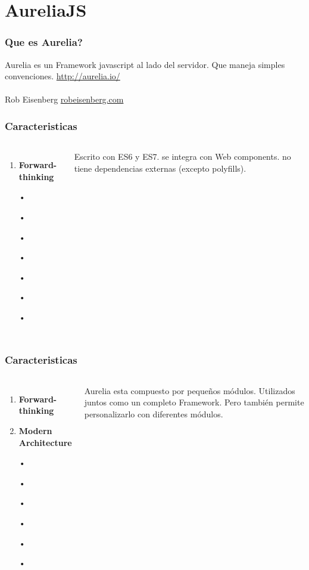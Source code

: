 \documentclass{beamer}
\begin{document}
\section{AureliaJS} %
\begin{frame}
\frametitle{Que es Aurelia?}
Aurelia es un Framework javascript al lado del servidor. Que maneja simples convenciones.
{\color{blue}\url{http://aurelia.io/}}
\\~\\
Rob Eisenberg
{\color{blue}\url{robeisenberg.com}}
\end{frame}
\begin{frame}
\frametitle{Caracteristicas}
\begin{columns}[c]
\begin{enumerate}
\item \textbf{Forward-thinking}
\item[•]
\item[•]
\item[•]
\item[•]
\item[•]
\item[•]
\item[•]
\end{enumerate}
Escrito con ES6 y ES7. se integra con Web components. no tiene dependencias externas (excepto polyfills).
\end{columns}
\end{frame}
\begin{frame}
\frametitle{Caracteristicas}
\begin{columns}[c]
\begin{enumerate}
\item \textbf{Forward-thinking}
\item \textbf{Modern Architecture}
\item[•]
\item[•]
\item[•]
\item[•]
\item[•]
\item[•]
\end{enumerate}
Aurelia esta compuesto por peque\~nos m\'odulos. Utilizados juntos como un completo Framework. Pero tambi\'en permite personalizarlo con diferentes m\'odulos.
\end{columns}
\end{frame}
\end{document}
